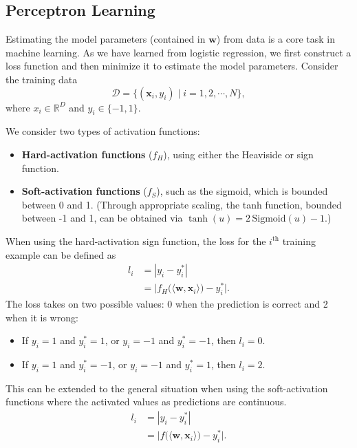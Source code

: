 \documentclass[12pt]{article}
\begin{document}
\subsection{Perceptron Learning}
Estimating the model parameters (contained in \(\bm{w}\)) from data is a core task in machine learning. As we have learned from logistic regression, we first construct a loss function and then minimize it to estimate the model parameters. Consider the training data
\[
\mathcal{D} = \{ (\bm{x}_i, y_i) \mid i = 1, 2, \cdots, N\},
\]
where \(x_i \in \mathbb{R}^D\) and \(y_i \in \{-1, 1\}\).

We consider two types of activation functions:
\begin{itemize}
    \item \textbf{Hard-activation functions} (\(f_H\)), using either the Heaviside or sign function.
    \item \textbf{Soft-activation functions} (\(f_S\)), such as the sigmoid, which is bounded between 0 and 1. (Through appropriate scaling, the tanh function, bounded between -1 and 1, can be obtained via \(\tanh(u)=2\,\mathrm{Sigmoid}(u)-1\).)
\end{itemize}

When using the hard-activation sign function, the loss for the \(i^\text{th}\) training example can be defined as
\begin{equation}
\begin{split}
        l_i & = |y_i - y_i^*|\\[1ex]
            & = \bigl| f_H\bigl(\langle \bm{w}, \bm{x}_i\rangle\bigr) - y_i^* \bigr|.
\end{split}
\label{t05eq05}
\end{equation}
The loss takes on two possible values: 0 when the prediction is correct and 2 when it is wrong:
\begin{itemize}
    \item If \(y_i = 1\) and \(y_i^* = 1\), or \(y_i = -1\) and \(y_i^* = -1\), then \(l_i=0\).
    \item If \(y_i = 1\) and \(y_i^* = -1\), or \(y_i = -1\) and \(y_i^* = 1\), then \(l_i=2\).
\end{itemize}
This can be extended to the general situation when using the soft-activation functions where the activated values as predictions are continuous.
\begin{equation}
\begin{split}
        l_i & = |y_i - y_i^*|\\[1ex]
            & = \bigl| f\bigl(\langle \bm{w}, \bm{x}_i\rangle\bigr) - y_i^* \bigr|.
\end{split}
\label{t05eq06}
\end{equation}
\end{document}

